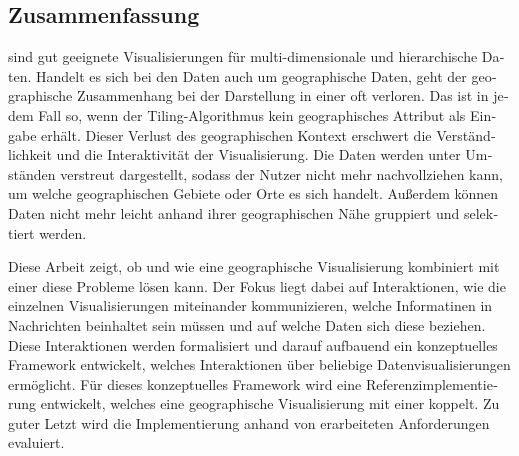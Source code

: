 \begin{otherlanguage}{german}
\chapter*{Zusammenfassung}

\tmaps{} sind gut geeignete Visualisierungen für multi-dimensionale und hierarchische Daten.
Handelt es sich bei den Daten auch um geographische Daten, geht der geographische Zusammenhang bei der Darstellung in einer \tmap{} oft verloren.
Das ist in jedem Fall so, wenn der Tiling-Algorithmus kein geographisches Attribut als Eingabe erhält.
Dieser Verlust des geographischen Kontext erschwert die Verständlichkeit und die Interaktivität der Visualisierung.
Die Daten werden unter Umständen verstreut dargestellt, sodass der Nutzer nicht mehr nachvollziehen kann, um welche geographischen Gebiete oder Orte es sich handelt.
Außerdem können Daten nicht mehr leicht anhand ihrer geographischen Nähe gruppiert und selektiert werden.

Diese Arbeit zeigt, ob und wie eine geographische Visualisierung kombiniert mit einer \tmap{} diese Probleme lösen kann.
Der Fokus liegt dabei auf Interaktionen, wie die einzelnen Visualisierungen miteinander kommunizieren, welche Informatinen in Nachrichten beinhaltet sein müssen und auf welche Daten sich diese beziehen.
Diese Interaktionen werden formalisiert und darauf aufbauend ein konzeptuelles Framework entwickelt, welches Interaktionen über beliebige Datenvisualisierungen ermöglicht.
Für dieses konzeptuelles Framework wird eine Referenzimplementierung entwickelt, welches eine geographische Visualisierung mit einer \tmap{} koppelt.
Zu guter Letzt wird die Implementierung anhand von erarbeiteten Anforderungen evaluiert.

\end{otherlanguage}

